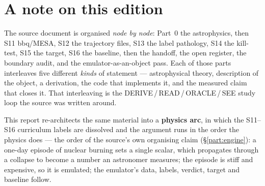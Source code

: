 \section*{A note on this edition}
\label{sec:edition}

The source document is organised \emph{node by node}: Part~0 the astrophysics,
then S11 bbq/MESA, S12 the trajectory files, S13 the label pathology, S14 the
kill-test, S15 the target, S16 the baseline, then the handoff, the open register,
the boundary audit, and the emulator-as-an-object pass. Each of those parts
interleaves five different \emph{kinds} of statement --- astrophysical theory,
description of the object, a derivation, the code that implements it, and the
measured claim that closes it. That interleaving is the
DERIVE\,/\,READ\,/\,ORACLE\,/\,SEE study loop the source was written around.

This report re-architects the same material into a \textbf{physics arc}, in
which the S11--S16 curriculum labels are dissolved and the argument runs in the
order the physics does --- the order of the source's own organising claim
(\S\ref{part:engine}): a one-day episode of nuclear burning sets a single scalar,
which propagates through a collapse to become a number an astronomer measures;
the episode is stiff and expensive, so it is emulated; the emulator's data,
labels, verdict, target and baseline follow.

